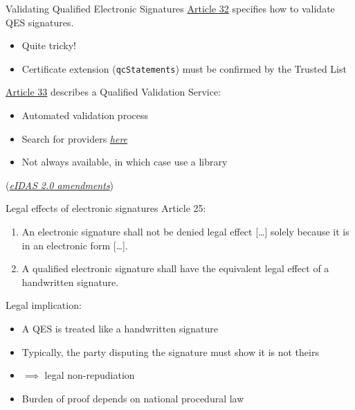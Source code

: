 \begin{frame}{Validating Qualified Electronic Signatures}
  \href{https://eur-lex.europa.eu/legal-content/EN/TXT/HTML/?uri=CELEX\%3A32014R0910\#d1e2594-73-1}{Article 32} specifies how to validate QES signatures.
  \begin{itemize}[<+(1)->]
    \item Quite tricky!
    \item Certificate extension (\texttt{qcStatements}) must be confirmed by the Trusted List
  \end{itemize}

  \vspace*{1em}

  \pause
  \href{https://eur-lex.europa.eu/legal-content/EN/TXT/HTML/?uri=CELEX:32014R0910\#d1e2664-73-1}{Article 33} describes a Qualified Validation Service:
  \begin{itemize}
    \item Automated validation process
    \item Search for providers \href{https://eidas.ec.europa.eu/efda/trust-services/browse/eidas/tls/search/type?step=1}{\textit{here}}
    \item Not always available, in which case use a library
  \end{itemize}

  \vspace*{1em}

  \pause
  (\href{https://eur-lex.europa.eu/legal-content/EN/TXT/HTML/?uri=OJ:L\_202401183\#d1e3370-1-1}{\textit{eIDAS 2.0 amendments}})
\end{frame}

\begin{frame}{Legal effects of electronic signatures}
  \pause
  Article 25:
  \begin{enumerate}
    \item An electronic signature shall not be denied legal effect [\dots] solely because it is in an electronic form [\dots].
    \item A qualified electronic signature shall have the equivalent legal effect of a handwritten signature.
  \end{enumerate}

  \vspace*{0.5em}

  \pause
  Legal implication:
  \begin{itemize}[<+(1)->]
    \item A QES is treated like a handwritten signature
    \item Typically, the party disputing the signature must show it is not theirs
    \item $\implies$ legal non-repudiation
    \item Burden of proof depends on national procedural law
  \end{itemize}
\end{frame}

